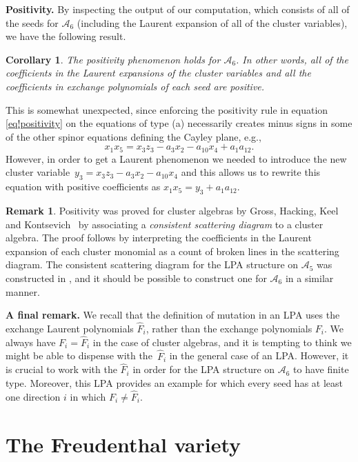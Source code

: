 \documentclass[10pt,a4paper]{amsart}
\numberwithin{equation}{section}
\newtheorem{cor}[thm]{Corollary}
\theoremstyle{definition}
\newtheorem{rmk}[thm]{Remark}
\begin{document}
{\bf Positivity.}
By inspecting the output of our computation, which consists of all of the seeds for $\mathcal A_6$ (including the Laurent expansion of all of the cluster variables), we have the following result.


\begin{cor}\label{cor!positivity}
The positivity phenomenon holds for $\mathcal A_6$. In other words, all of the coefficients in the Laurent expansions of the cluster variables and all the coefficients in exchange polynomials of each seed are positive.
\end{cor}

This is somewhat unexpected, since enforcing the positivity rule in equation \eqref{eq!positivity} on the equations of type (a) necessarily creates minus signs in some of the other spinor equations defining the Cayley plane, e.g.,
\[ x_1x_5 = x_3z_3 - a_3x_2 - a_{10}x_4 + a_1a_{12}. \]
However, in order to get a Laurent phenomenon we needed to introduce the new cluster variable~${y_3=x_3z_3 - a_3x_2 - a_{10}x_4}$ and this allows us to rewrite this equation with positive coefficients as $x_1x_5 = y_3 + a_1a_{12}$.

\begin{rmk}
Positivity was proved for cluster algebras by Gross, Hacking, Keel and Kontsevich~\cite{ghkk} by associating a \emph{consistent scattering diagram} to a cluster algebra. The proof follows by interpreting the coefficients in the Laurent expansion of each cluster monomial as a count of broken lines in the scattering diagram. The consistent scattering diagram for the LPA structure on $\mathcal A_5$ was constructed in \cite{duc}, and it should be possible to construct one for $\mathcal A_6$ in a similar manner.
\end{rmk}

{\bf A final remark.}
We recall that the definition of mutation in an LPA uses the exchange Laurent polynomials $\widehat{F}_i$, rather than the exchange polynomials $F_i$. We always have $F_i=\widehat F_i$ in the case of cluster algebras, and it is tempting to think we might be able to dispense with the~$\widehat F_i$ in the general case of an LPA. However, it is crucial to work with the $\widehat F_i$ in order for the LPA structure on $\mathcal A_6$ to have finite type. Moreover, this LPA provides an example for which every seed has at least one direction $i$ in which $F_i\neq\widehat F_i$.

\section{The Freudenthal variety}
\end{document}
